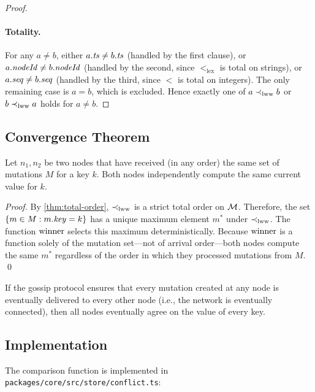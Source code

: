 \begin{proof}
\paragraph{Totality.}
For any $a \neq b$, either $a.\mathit{ts} \neq b.\mathit{ts}$ (handled by the first clause),
or $a.\mathit{nodeId} \neq b.\mathit{nodeId}$ (handled by the second, since $<_{\mathrm{lex}}$ is
total on strings), or $a.\mathit{seq} \neq b.\mathit{seq}$ (handled by the third, since $<$
is total on integers). The only remaining case is $a = b$, which is excluded.
Hence exactly one of $a \prec_{\mathrm{lww}} b$ or $b \prec_{\mathrm{lww}} a$ holds for $a \neq b$. \checkmark
\end{proof}

\subsection{Convergence Theorem}

\begin{theorem}
\label{thm:convergence}
Let $n_1, n_2$ be two nodes that have received (in any order) the same set of
mutations $M$ for a key $k$. Both nodes independently compute the same current
value for $k$.
\end{theorem}

\begin{proof}
By \cref{thm:total-order}, $\prec_{\mathrm{lww}}$ is a strict total order on $\mathcal{M}$.
Therefore, the set $\{m \in M : m.\mathit{key} = k\}$ has a unique maximum element
$m^*$ under $\prec_{\mathrm{lww}}$. The function $\mathrm{winner}$ selects this maximum deterministically.
Because $\mathrm{winner}$ is a function solely of the mutation set---not of arrival
order---both nodes compute the same $m^*$ regardless of the order in which
they processed mutations from $M$. \qed
\end{proof}

\begin{corollary}
\label{cor:eventual}
If the gossip protocol ensures that every mutation created at any node is
eventually delivered to every other node (i.e., the network is eventually
connected), then all nodes eventually agree on the value of every key.
\end{corollary}

\subsection{Implementation}

The comparison function is implemented in \texttt{packages/core/src/store/conflict.ts}:


